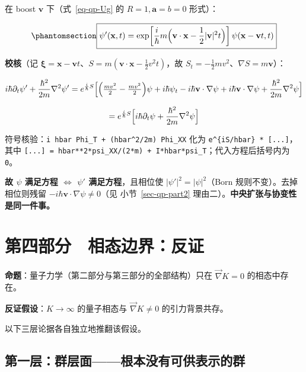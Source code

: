 \documentclass[
  chinese,
  a4paper,
  UTF8,
  12pt,
  oneside,
  openany]{ctexbook}
\theoremstyle{plain}
\theoremstyle{plain}
\theoremstyle{plain}
\theoremstyle{definition}
\theoremstyle{plain}
\theoremstyle{plain}
\theoremstyle{remark}
\begin{document}
在 boost \(\mathbf v\) 下（式~\ref{eq-qp-Ug} 的 \(R=1,\mathbf a=b=0\)
形式）：

\begin{equation}\protect\phantomsection\label{eq-qp-boost}{
\boxed{\psi'(\mathbf x,t)=\exp\!\left[\frac{i}{\hbar}m\Bigl(\mathbf v\cdot\mathbf x-\frac{1}{2}\lvert\mathbf v\rvert^{2}t\Bigr)\right]\psi(\mathbf x-\mathbf v t,t)}
}\end{equation}

\textbf{校核}（记
\(\boldsymbol\xi=\mathbf x-\mathbf vt\)、\(S=m(\mathbf v\cdot\mathbf x-\tfrac12 v^{2}t)\)，故
\(S_t=-\tfrac12mv^{2}\)、\(\nabla S=m\mathbf v\)）：

\[
i\hbar\partial_t\psi'+\frac{\hbar^{2}}{2m}\nabla^{2}\psi'
=e^{\frac{i}{\hbar}S}\Bigl[\Bigl(\tfrac{mv^{2}}{2}-\tfrac{mv^{2}}{2}\Bigr)\psi+i\hbar\psi_t-i\hbar\mathbf v\cdot\nabla\psi
+i\hbar\mathbf v\cdot\nabla\psi+\frac{\hbar^{2}}{2m}\nabla^{2}\psi\Bigr]
\]

\[
=e^{\frac{i}{\hbar}S}\Bigl[i\hbar\partial_t\psi+\frac{\hbar^{2}}{2m}\nabla^{2}\psi\Bigr]
\]

符号核验：\texttt{i\ hbar\ Phi\_T\ +\ (hbar\^{}2/2m)\ Phi\_XX} 化为
\texttt{e\^{}\{iS/hbar\}\ *\ {[}...{]}}，其中
\texttt{{[}...{]}\ =\ hbar**2*psi\_XX/(2*m)\ +\ I*hbar*psi\_T}；代入方程后括号内为
\texttt{0}。

\textbf{故 \(\psi\) 满足方程 \(\Leftrightarrow\) \(\psi'\)
满足方程}，且相位使 \(\lvert\psi'\rvert^{2}=\lvert\psi\rvert^{2}\)（Born
规则不变）。去掉相位则残留 \(-i\hbar\mathbf v\cdot\nabla\psi\neq0\)（见
小节~\ref{sec-qp-part2} 理由二）。\textbf{中央扩张与协变性是同一件事。}

\section{第四部分　相态边界：反证}\label{sec-qp-part4}

\textbf{命题}：量子力学（第二部分与第三部分的全部结构）只在
\(\vec\nabla K=0\) 的相态中存在。

\textbf{反证假设}：\(K\to\infty\) 的量子相态与 \(\vec\nabla K\neq0\)
的引力背景共存。

以下三层论据各自独立地推翻该假设。

\subsection{第一层：群层面------根本没有可供表示的群}\label{ux7b2cux4e00ux5c42ux7fa4ux5c42ux9762ux6839ux672cux6ca1ux6709ux53efux4f9bux8868ux793aux7684ux7fa4}
\end{document}
